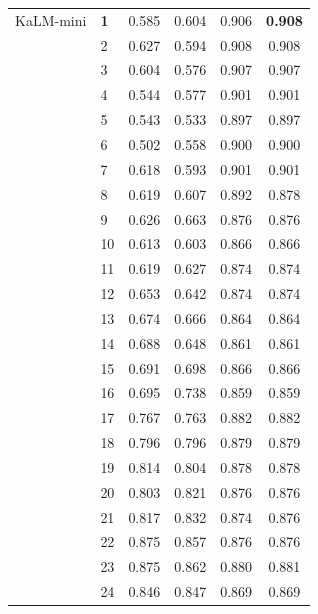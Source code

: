 \begin{longtable}{llcccc}
\midrule
KaLM-mini & \textbf{1} & 0.585 & 0.604 & 0.906 & \textbf{0.908} \\
 & 2 & 0.627 & 0.594 & 0.908 & 0.908 \\
 & 3 & 0.604 & 0.576 & 0.907 & 0.907 \\
 & 4 & 0.544 & 0.577 & 0.901 & 0.901 \\
 & 5 & 0.543 & 0.533 & 0.897 & 0.897 \\
 & 6 & 0.502 & 0.558 & 0.900 & 0.900 \\
 & 7 & 0.618 & 0.593 & 0.901 & 0.901 \\
 & 8 & 0.619 & 0.607 & 0.892 & 0.878 \\
 & 9 & 0.626 & 0.663 & 0.876 & 0.876 \\
 & 10 & 0.613 & 0.603 & 0.866 & 0.866 \\
 & 11 & 0.619 & 0.627 & 0.874 & 0.874 \\
 & 12 & 0.653 & 0.642 & 0.874 & 0.874 \\
 & 13 & 0.674 & 0.666 & 0.864 & 0.864 \\
 & 14 & 0.688 & 0.648 & 0.861 & 0.861 \\
 & 15 & 0.691 & 0.698 & 0.866 & 0.866 \\
 & 16 & 0.695 & 0.738 & 0.859 & 0.859 \\
 & 17 & 0.767 & 0.763 & 0.882 & 0.882 \\
 & 18 & 0.796 & 0.796 & 0.879 & 0.879 \\
 & 19 & 0.814 & 0.804 & 0.878 & 0.878 \\
 & 20 & 0.803 & 0.821 & 0.876 & 0.876 \\
 & 21 & 0.817 & 0.832 & 0.874 & 0.876 \\
 & 22 & 0.875 & 0.857 & 0.876 & 0.876 \\
 & 23 & 0.875 & 0.862 & 0.880 & 0.881 \\
 & 24 & 0.846 & 0.847 & 0.869 & 0.869 \\
\end{longtable}
\endgroup
